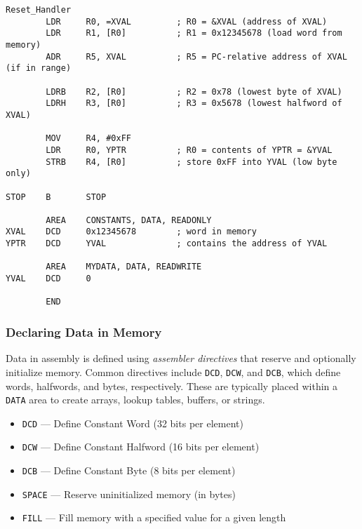 \begin{lstlisting}[caption={Examples of Load and Store Instructions}]
Reset_Handler
        LDR     R0, =XVAL         ; R0 = &XVAL (address of XVAL)
        LDR     R1, [R0]          ; R1 = 0x12345678 (load word from memory)
        ADR     R5, XVAL          ; R5 = PC-relative address of XVAL (if in range)

        LDRB    R2, [R0]          ; R2 = 0x78 (lowest byte of XVAL)
        LDRH    R3, [R0]          ; R3 = 0x5678 (lowest halfword of XVAL)

        MOV     R4, #0xFF
        LDR     R0, YPTR          ; R0 = contents of YPTR = &YVAL
        STRB    R4, [R0]          ; store 0xFF into YVAL (low byte only)

STOP    B       STOP

        AREA    CONSTANTS, DATA, READONLY
XVAL    DCD     0x12345678        ; word in memory
YPTR    DCD     YVAL              ; contains the address of YVAL

        AREA    MYDATA, DATA, READWRITE
YVAL    DCD     0

        END
\end{lstlisting}



\subsubsection{Declaring Data in Memory}

Data in assembly is defined using \emph{assembler directives} that reserve and optionally initialize memory.  
Common directives include \texttt{DCD}, \texttt{DCW}, and \texttt{DCB}, which define words, halfwords, and bytes, respectively.  
These are typically placed within a \texttt{DATA} area to create arrays, lookup tables, buffers, or strings.

\begin{itemize}[nosep]
    \item \texttt{DCD} — Define Constant Word (32 bits per element)
    \item \texttt{DCW} — Define Constant Halfword (16 bits per element)
    \item \texttt{DCB} — Define Constant Byte (8 bits per element)
    \item \texttt{SPACE} — Reserve uninitialized memory (in bytes)
    \item \texttt{FILL} — Fill memory with a specified value for a given length
\end{itemize}

